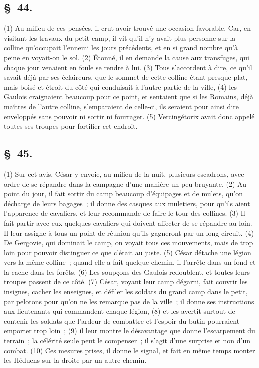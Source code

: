 \documentclass[french,twoside]{book} %
\begin{document}
\subsection[{§ 44.}]{ \textsc{§ 44.} }
\noindent (1) Au milieu de ces pensées, il crut avoir trouvé une occasion favorable. Car, en visitant les travaux du petit camp, il vit qu’il n’y avait plus personne sur la colline qu’occupait l’ennemi les jours précédents, et en si grand nombre qu’à peine en voyait-on le sol. (2) Étonné, il en demande la cause aux transfuges, qui chaque jour venaient en foule se rendre à lui. (3) Tous s’accordent à dire, ce qu’il savait déjà par ses éclaireurs, que le sommet de cette colline étant presque plat, mais boisé et étroit du côté qui conduisait à l’autre partie de la ville, (4) les Gaulois craignaient beaucoup pour ce point, et sentaient que si les Romains, déjà maîtres de l’autre colline, s’emparaient de celle-ci, ils seraient pour ainsi dire enveloppés sans pouvoir ni sortir ni fourrager. (5) Vercingétorix avait donc appelé toutes ses troupes pour fortifier cet endroit.
\subsection[{§ 45.}]{ \textsc{§ 45.} }
\noindent (1) Sur cet avis, César y envoie, au milieu de la nuit, plusieurs escadrons, avec ordre de se répandre dans la campagne d’une manière un peu bruyante. (2) Au point du jour, il fait sortir du camp beaucoup d’équipages et de mulets, qu’on décharge de leurs bagages ; il donne des casques aux muletiers, pour qu’ils aient l’apparence de cavaliers, et leur recommande de faire le tour des collines. (3) Il fait partir avec eux quelques cavaliers qui doivent affecter de se répandre au loin. Il leur assigne à tous un point de réunion qu’ils gagneront par un long circuit. (4) De Gergovie, qui dominait le camp, on voyait tous ces mouvements, mais de trop loin pour pouvoir distinguer ce que c’était au juste. (5) César détache une légion vers la même colline ; quand elle a fait quelque chemin, il l’arrête dans un fond et la cache dans les forêts. (6) Les soupçons des Gaulois redoublent, et toutes leurs troupes passent de ce côté. (7) César, voyant leur camp dégarni, fait couvrir les insignes, cacher les enseignes, et défiler les soldats du grand camp dans le petit, par pelotons pour qu’on ne les remarque pas de la ville ; il donne ses instructions aux lieutenants qui commandent chaque légion, (8) et les avertit surtout de contenir les soldats que l’ardeur de combattre et l’espoir du butin pourraient emporter trop loin ; (9) il leur montre le désavantage que donne l’escarpement du terrain ; la célérité seule peut le compenser ; il s’agit d’une surprise et non d’un combat. (10) Ces mesures prises, il donne le signal, et fait en même temps monter les Héduens sur la droite par un autre chemin.
\end{document}
